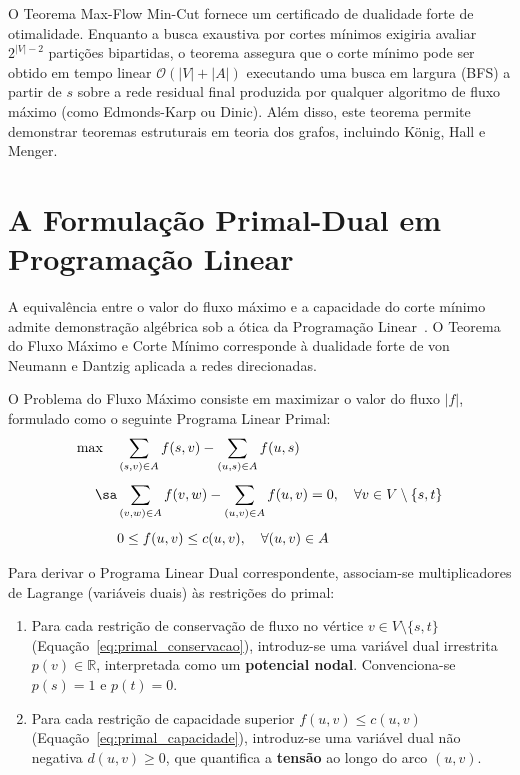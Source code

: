  O Teorema Max-Flow Min-Cut fornece um certificado de dualidade forte de otimalidade. Enquanto a busca exaustiva por cortes mínimos exigiria avaliar $2^{|V|-2}$ partições bipartidas, o teorema assegura que o corte mínimo pode ser obtido em tempo linear $\mathcal{O}(|V| + |A|)$ executando uma busca em largura (BFS) a partir de $s$ sobre a rede residual final produzida por qualquer algoritmo de fluxo máximo (como Edmonds-Karp ou Dinic). Além disso, este teorema permite demonstrar teoremas estruturais em teoria dos grafos, incluindo König, Hall e Menger.


\section{A Formulação Primal-Dual em Programação Linear}\label{sec:dualidade_primal_dual}

A equivalência entre o valor do fluxo máximo e a capacidade do corte mínimo admite demonstração algébrica sob a ótica da Programação Linear~\cite{cook1998combinatorial, schrijver2003combinatorial}. O Teorema do Fluxo Máximo e Corte Mínimo corresponde à dualidade forte de von Neumann e Dantzig aplicada a redes direcionadas.

O Problema do Fluxo Máximo consiste em maximizar o valor do fluxo $|f|$, formulado como o seguinte Programa Linear Primal:
\begin{align}
    \max \quad & \sum_{(s,v) \in A} f(s,v) - \sum_{(u,s) \in A} f(u,s) \label{eq:primal_obj} \\[4pt]
    \sa & \sum_{(v,w) \in A} f(v,w) - \sum_{(u,v) \in A} f(u,v) = 0, \quad \forall v \in V \setminus \{s, t\} \label{eq:primal_conservacao} \\[4pt]
    & 0 \le f(u,v) \le c(u,v), \quad \forall (u,v) \in A \label{eq:primal_capacidade}
\end{align}

Para derivar o Programa Linear Dual correspondente, associam-se multiplicadores de Lagrange (variáveis duais) às restrições do primal:
\begin{enumerate}
    \item Para cada restrição de conservação de fluxo no vértice $v \in V \setminus \{s,t\}$ (Equação~\ref{eq:primal_conservacao}), introduz-se uma variável dual irrestrita $p(v) \in \mathbb{R}$, interpretada como um \textbf{potencial nodal}. Convenciona-se $p(s) = 1$ e $p(t) = 0$.
    \item Para cada restrição de capacidade superior $f(u,v) \le c(u,v)$ (Equação~\ref{eq:primal_capacidade}), introduz-se uma variável dual não negativa $d(u,v) \ge 0$, que quantifica a \textbf{tensão} ao longo do arco $(u,v)$.
\end{enumerate}


